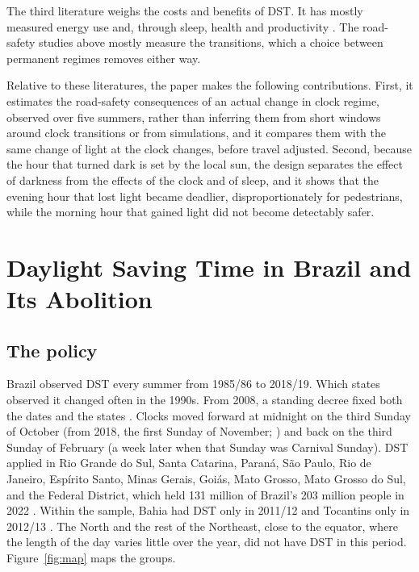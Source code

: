 The third literature weighs the costs and benefits of DST. It has mostly measured energy use \citep{kellogg2008daylight, kotchen2011does} and, through sleep, health and productivity \citep{gibson2018time, giuntella2019sunset, jin2020sleep, osbornechristenson2022saving, jagnani2024children}. The road-safety studies above mostly measure the transitions, which a choice between permanent regimes removes either way.

Relative to these literatures, the paper makes the following contributions. First, it estimates the road-safety consequences of an actual change in clock regime, observed over five summers, rather than inferring them from short windows around clock transitions or from simulations, and it compares them with the same change of light at the clock changes, before travel adjusted. Second, because the hour that turned dark is set by the local sun, the design separates the effect of darkness from the effects of the clock and of sleep, and it shows that the evening hour that lost light became deadlier, disproportionately for pedestrians, while the morning hour that gained light did not become detectably safer.

\section{Daylight Saving Time in Brazil and Its Abolition}\label{sec:background}

\subsection{The policy}

Brazil observed DST every summer from 1985/86 to 2018/19. Which states observed it changed often in the 1990s. From 2008, a standing decree fixed both the dates and the states \citep{brasil2008decreto}. Clocks moved forward at midnight on the third Sunday of October (from 2018, the first Sunday of November; \citealp{brasil2017decreto}) and back on the third Sunday of February (a week later when that Sunday was Carnival Sunday). DST applied in Rio Grande do Sul, Santa Catarina, Paran\'a, S\~ao Paulo, Rio de Janeiro, Esp\'irito Santo, Minas Gerais, Goi\'as, Mato Grosso, Mato Grosso do Sul, and the Federal District, which held 131 million of Brazil's 203 million people in 2022 \citep{ibge2023censo}. Within the sample, Bahia had DST only in 2011/12 and Tocantins only in 2012/13 \citep{brasil2011decreto, brasil2012decreto, brasil2013decreto}. The North and the rest of the Northeast, close to the equator, where the length of the day varies little over the year, did not have DST in this period. Figure~\ref{fig:map} maps the groups.

